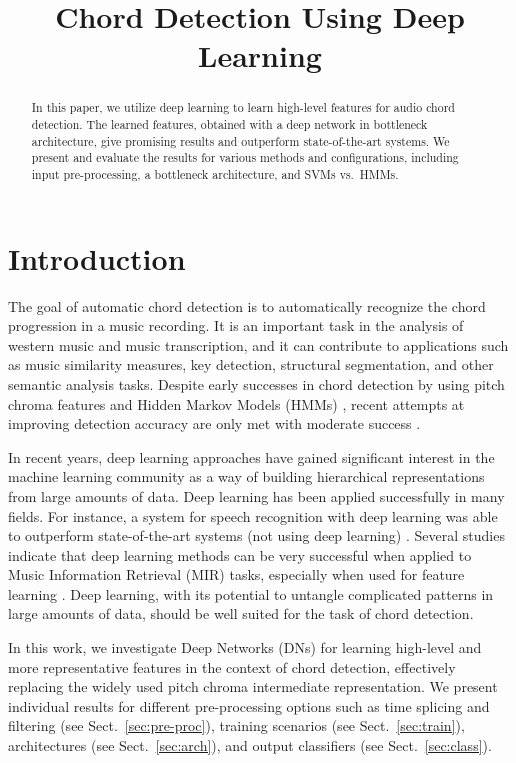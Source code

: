 \documentclass{article}
\title{Chord Detection Using Deep Learning}
\begin{document}
%
\maketitle
%
\begin{abstract}
In this paper, we utilize deep learning to learn high-level features for audio chord detection. The learned features, obtained with a deep network in bottleneck architecture, give promising results and outperform state-of-the-art systems. We present and evaluate the results for various methods and configurations, including input pre-processing, a bottleneck architecture, and SVMs vs.\ HMMs. 
\end{abstract}
%
\section{Introduction}
The goal of automatic chord detection is to automatically recognize the chord progression in a music recording. It is an important task in the analysis of western music and music transcription, and it can contribute to applications such as music similarity measures, key detection, structural segmentation, and other semantic analysis tasks. Despite early successes in chord detection by using pitch chroma features \cite{fujishima1999realtime} and Hidden Markov Models (HMMs) \cite{kawakami2000hidden}, recent attempts at improving detection accuracy are only met with moderate success \cite{ueda2010hmm,cho2013mirex}.

In recent years, deep learning approaches have gained significant interest in the machine learning community as a way of building hierarchical representations from large amounts of data. Deep learning has been applied successfully in many fields. For instance, a system for speech recognition with deep learning was able to outperform state-of-the-art systems (not using deep learning) \cite{hinton2012deep}. Several studies indicate that deep learning methods can be very successful when applied to Music Information Retrieval (MIR) tasks, especially when used for feature learning \cite{lee2009unsupervised,battenberg2012analyzing,humphrey2012moving,hamel2010learning}. Deep learning, with its potential to untangle complicated patterns in large amounts of data, should be well suited for the task of chord detection.

In this work, we investigate Deep Networks (DNs) for learning high-level and more representative features in the context of chord detection, effectively replacing the widely used pitch chroma intermediate representation. 
We present individual results for different pre-processing options such as time splicing and filtering (see Sect.~\ref{sec:pre-proc}), training scenarios (see Sect.~\ref{sec:train}), architectures (see Sect.~\ref{sec:arch}), and output classifiers (see Sect.~\ref{sec:class}). %
\end{document}

